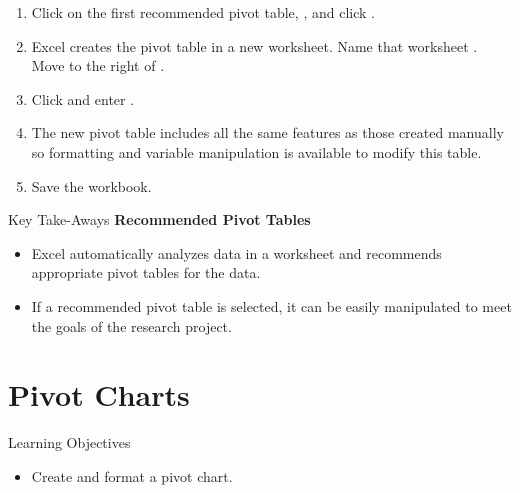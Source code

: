 \begin{enumerate}[resume]
	\item Click on the first recommended pivot table, , and click .
	\item Excel creates the pivot table in a new worksheet. Name that worksheet .
	Move  to the right of .
	\item Click  and enter .
	\item The new pivot table includes all the same features as those created manually so formatting and variable manipulation is available to modify this table.
	\item Save the  workbook.
\end{enumerate}

\begin{center}
	\begin{tkwbox}{Key Take-Aways}
		\textbf{Recommended Pivot Tables}
		\\
		\begin{itemize}
			\setlength{\itemsep}{0pt}
			\setlength{\parskip}{0pt}
			\setlength{\parsep}{0pt}
			
			\item Excel automatically analyzes data in a worksheet and recommends appropriate pivot tables for the data.
			\item If a recommended pivot table is selected, it can be easily manipulated to meet the goals of the research project.
			
		\end{itemize}
	\end{tkwbox}
\end{center}

\section{Pivot Charts}

\begin{center}
	\begin{objbox}{Learning Objectives}
		\begin{itemize}
			\setlength{\itemsep}{0pt}
			\setlength{\parskip}{0pt}
			\setlength{\parsep}{0pt}
			
			\item Create and format a pivot chart.
			
		\end{itemize}
	\end{objbox}
\end{center}

